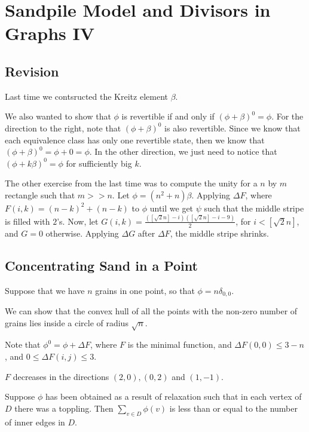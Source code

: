 \documentclass[11pt]{scrartcl}
\begin{document}
  \section{Sandpile Model and Divisors in Graphs IV}

  \subsection{Revision}

  Last time we contsructed the Kreitz element $\beta$.

  We also wanted to show that $\phi$ is revertible if and only if
  $(\phi + \beta)^{0} = \phi$. For the direction to the right, note
  that $(\phi + \beta)^{0}$ is also revertible. Since we know that
  each equivalence class has only one revertible state, then we know
  that $(\phi+\beta)^{0} = \phi + 0 = \phi$. In the other direction,
  we just need to notice that $(\phi + k \beta)^{0} = \phi$ for
  sufficiently big $k$.

  The other exercise from the last time was to compute the unity for a
  $n$ by $m$ rectangle such that $m >> n$. Let
  $\phi = (n^{2} + n)\beta$. Applying $\Delta F$, where
  $F(i, k) = (n-k)^{2} + (n-k)$ to $\phi$ until we get $\psi$ such
  that the middle stripe is filled with $2$'s. Now, let
  $G(i, k) = \frac{([\sqrt{2}n] -i)([\sqrt{2}n] - i - 9)}{2}$, for
  $i < [\sqrt{2}n]$, and $G = 0$ otherwise. Applying $\Delta G$ after
  $\Delta F$, the middle stripe shrinks.

  \subsection{Concentrating Sand in a Point}

  Suppose that we have $n$ grains in one point, so that
  $\phi = n \delta_{0, 0}$.

  We can show that the convex hull of all the points with the non-zero
  number of grains lies inside a circle of radius $\sqrt{n}$.

  Note that $\phi^{0} = \phi + \Delta F$, where $F$ is the minimal
  function, and $\Delta F(0, 0) \leq 3-n$, and
  $0 \leq \Delta F(i, j) \leq 3$.

  \begin{lemma}
    $F$ decreases in the directions $(2, 0), (0, 2)$ and $(1, -1)$.
  \end{lemma}

  \begin{exercise}

    Suppose $\phi$ has been obtained as a result of relaxation such
    that in each vertex of $D$ there was a toppling. Then
    $\sum_{v\in D}\phi(v)$ is less than or equal to the number of
    inner edges in $D$.

  \end{exercise}
\end{document}
